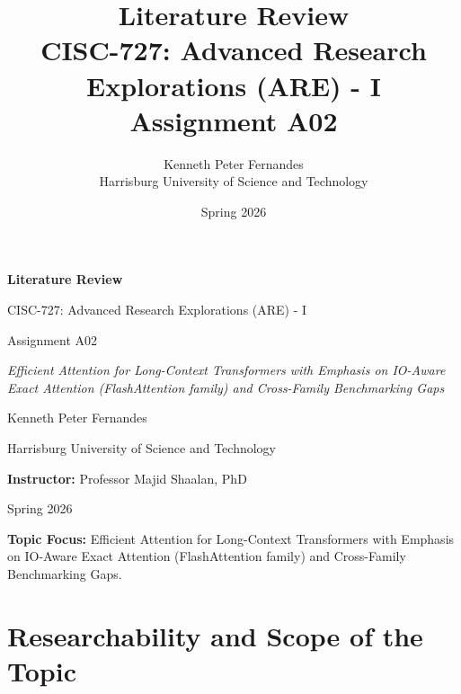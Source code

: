 \documentclass[12pt, a4paper]{article}
\title{%
    \vspace{2cm}
    \textbf{Literature Review} \\
    \vspace{0.5cm}
    \large CISC-727:   Advanced Research Explorations (ARE) - I\\
    \vspace{0.3cm}
    \large Assignment A02
}
\author{%
    Kenneth Peter Fernandes \\
    \vspace{0.3cm}
    Harrisburg University of Science and Technology
}
\date{Spring 2026}
\begin{document}
\begin{titlepage}
    \centering
    \vspace*{2cm}
    {\LARGE \textbf{Literature Review} \par}
    \vspace{1cm}
    {\large CISC-727: Advanced Research Explorations (ARE) - I \par}
    \vspace{0.5cm}
    {\large Assignment A02 \par}
    \vspace{1.5cm}
    {\large \textit{Efficient Attention for Long-Context Transformers with Emphasis on IO-Aware Exact Attention (FlashAttention family) and Cross-Family Benchmarking Gaps} \par}
    \vspace{1.5cm}
    {\Large Kenneth Peter Fernandes \par}
    \vspace{0.5cm}
    {\large Harrisburg University of Science and Technology \par}
    \vspace{1.5cm}
    {\large \textbf{Instructor:} Professor Majid Shaalan, PhD \par}
    \vspace{1.5cm}
    {\large Spring 2026 \par}
    \vfill
\end{titlepage}

\newpage
\tableofcontents
\newpage

\noindent\textbf{Topic Focus:} Efficient Attention for Long-Context Transformers with Emphasis on IO-Aware Exact Attention (FlashAttention family) and Cross-Family Benchmarking Gaps.

\vspace{1em}

\section{Researchability and Scope of the Topic}
\end{document}
